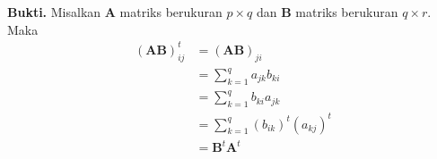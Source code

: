 \documentclass[a4paper, 12pt]{article}
\begin{document}
\begin{enumerate}
    \textbf{Bukti.} Misalkan $\mathbf{A}$ matriks berukuran $p\times  q$ dan $\mathbf{B}$ matriks berukuran $q\times  r$. Maka
    \begin{align*}
    (\mathbf{AB})^t_{ij} &= (\mathbf{AB})_{ji}  \\
      &= \sum_{k = 1}^q a_{jk}b_{ki}\\
      & =  \sum_{k = 1}^q b_{ki}a_{jk}\\
      &  =  \sum_{k = 1}^q (b_{ik})^t(a_{kj})^t
      \\
      & = \mathbf{B}^t\mathbf{A}^t
    \end{align*}
     \end{enumerate}
\end{document}
